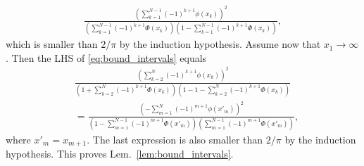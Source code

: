 \documentclass[letterpaper, conference,9pt]{IEEEtran}      %
\begin{document}
\begin{align*}
\frac{ \left(  \sum_{k=1}^{N-1} (-1)^{k+1}\phi(x_k) \right)^2} 
{\left( \sum_{k=1}^{N-1} (-1)^{k+1} \Phi(x_k) \right)\left(1- \sum_{k=1}^{N-1} (-1)^{k+1} \Phi(x_k)  \right) } ,
\end{align*}
which is smaller than $2/\pi$ by the induction hypothesis. Assume now that $x_1 \rightarrow \infty$. Then the LHS of
\eqref{eq:bound_intervals} equals
\begin{align*}
& \frac{ \left(  \sum_{k=2}^{N} (-1)^{k+1}\phi(x_k) \right)^2} 
{\left( 1 + \sum_{k=2}^{N} (-1)^{k+1} \Phi(x_k) \right)\left(1- 1 - \sum_{k=2}^{N} (-1)^{k+1} \Phi(x_k)  \right) }  \\
& = \frac{ \left(  -\sum_{m=1}^{N} (-1)^{m+1}\phi(x'_m) \right)^2} 
{\left( 1 - \sum_{m=1}^{N-1} (-1)^{m+1} \Phi(x'_{m}) \right)\left( \sum_{m=1}^{N-1} (-1)^{m+1} \Phi(x'_{m})  \right) },
\end{align*}
where $x'_{m} = x_{m+1}$. The last expression is also smaller than $2/\pi$ by the induction hypothesis. This proves Lem.~\ref{lem:bound_intervals}. \\
\end{document}
